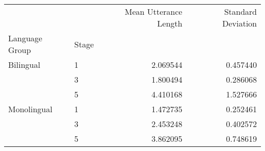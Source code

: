\begin{tabular}{llrr}
\toprule
            &   &  Mean Utterance Length &  Standard Deviation \\
Language Group & Stage &                        &                     \\
\midrule
Bilingual & 1 &               2.069544 &            0.457440 \\
            & 3 &               1.800494 &            0.286068 \\
            & 5 &               4.410168 &            1.527666 \\
Monolingual & 1 &               1.472735 &            0.252461 \\
            & 3 &               2.453248 &            0.402572 \\
            & 5 &               3.862095 &            0.748619 \\
\bottomrule
\end{tabular}
